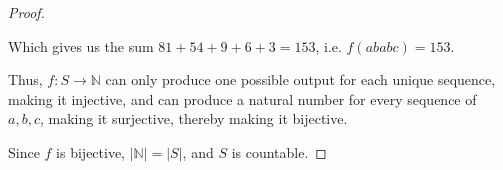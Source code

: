 \documentclass[12pt, a4paper]{article}
\newcommand{\N}{\mathbb{N}}
\begin{document}
\begin{proof}
\begin{center}
        \makebox[8cm][s]{$\downarrow$ $\downarrow$ $\downarrow$ $\downarrow$ $\downarrow$}

    \end{center}

    Which gives us the sum $81 + 54 + 9 + 6 + 3 = 153$, i.e. $f(ababc) = 153$.

    Thus, $f \colon S \to \N$ can only produce one possible output for each unique sequence, 
    making it injective, and can produce a natural number for every sequence of $a, b, c$, making
    it surjective, thereby making it bijective.

    Since $f$ is bijective, $|\N| = |S|$, and $S$ is countable.
\end{proof}
\end{document}
